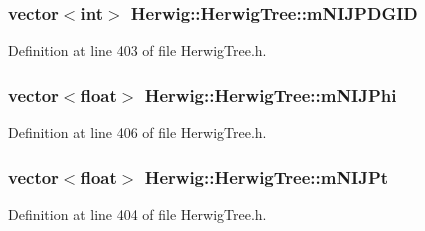 \subsubsection[{\texorpdfstring{m\+N\+I\+J\+P\+D\+G\+ID}{mNIJPDGID}}]{\setlength{\rightskip}{0pt plus 5cm}vector$<$int$>$ Herwig\+::\+Herwig\+Tree\+::m\+N\+I\+J\+P\+D\+G\+ID\hspace{0.3cm}{\ttfamily [protected]}}\hypertarget{class_herwig_1_1_herwig_tree_a6fbb8c1dd6e2b4ed67122f74ab0da929}{}\label{class_herwig_1_1_herwig_tree_a6fbb8c1dd6e2b4ed67122f74ab0da929}


Definition at line 403 of file Herwig\+Tree.\+h.

\subsubsection[{\texorpdfstring{m\+N\+I\+J\+Phi}{mNIJPhi}}]{\setlength{\rightskip}{0pt plus 5cm}vector$<$float$>$ Herwig\+::\+Herwig\+Tree\+::m\+N\+I\+J\+Phi\hspace{0.3cm}{\ttfamily [protected]}}\hypertarget{class_herwig_1_1_herwig_tree_a6d02449335894d8aaa1d794c08d18108}{}\label{class_herwig_1_1_herwig_tree_a6d02449335894d8aaa1d794c08d18108}


Definition at line 406 of file Herwig\+Tree.\+h.

\subsubsection[{\texorpdfstring{m\+N\+I\+J\+Pt}{mNIJPt}}]{\setlength{\rightskip}{0pt plus 5cm}vector$<$float$>$ Herwig\+::\+Herwig\+Tree\+::m\+N\+I\+J\+Pt\hspace{0.3cm}{\ttfamily [protected]}}\hypertarget{class_herwig_1_1_herwig_tree_a95e4e19ce467ec60b52960103eadeff7}{}\label{class_herwig_1_1_herwig_tree_a95e4e19ce467ec60b52960103eadeff7}


Definition at line 404 of file Herwig\+Tree.\+h.

